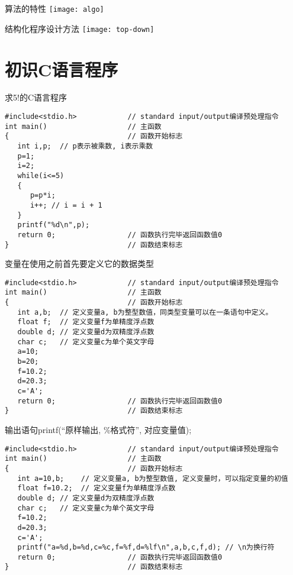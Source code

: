 \begin{frame}{算法的特性}
\texttt{[image: algo]}
\end{frame}

\begin{frame}{结构化程序设计方法}
\texttt{[image: top-down]}
\end{frame}

\section{初识C语言程序}

\begin{frame}[fragile]{求5!的C语言程序}
\begin{lstlisting}
#include<stdio.h>            // standard input/output编译预处理指令
int main()                   // 主函数
{                            // 函数开始标志
   int i,p;  // p表示被乘数, i表示乘数
   p=1;
   i=2;
   while(i<=5)
   {  
      p=p*i;
      i++; // i = i + 1
   }
   printf("%d\n",p);
   return 0;                 // 函数执行完毕返回函数值0
}                            // 函数结束标志
\end{lstlisting}
\end{frame}

\begin{frame}[fragile]{变量在使用之前首先要定义它的数据类型}
\begin{lstlisting}
#include<stdio.h>            // standard input/output编译预处理指令
int main()                   // 主函数
{                            // 函数开始标志
   int a,b;  // 定义变量a, b为整型数值，同类型变量可以在一条语句中定义。
   float f;  // 定义变量f为单精度浮点数
   double d; // 定义变量d为双精度浮点数
   char c;   // 定义变量c为单个英文字母
   a=10;
   b=20;
   f=10.2;
   d=20.3;
   c='A';
   return 0;                 // 函数执行完毕返回函数值0
}                            // 函数结束标志
\end{lstlisting}
\end{frame}

\begin{frame}[fragile]{输出语句printf(``原样输出, \%格式符'', 对应变量值);}
\begin{lstlisting}
#include<stdio.h>            // standard input/output编译预处理指令
int main()                   // 主函数
{                            // 函数开始标志
   int a=10,b;    // 定义变量a, b为整型数值, 定义变量时，可以指定变量的初值
   float f=10.2;  // 定义变量f为单精度浮点数
   double d; // 定义变量d为双精度浮点数
   char c;   // 定义变量c为单个英文字母
   f=10.2;
   d=20.3;
   c='A';
   printf("a=%d,b=%d,c=%c,f=%f,d=%lf\n",a,b,c,f,d); // \n为换行符
   return 0;                 // 函数执行完毕返回函数值0
}                            // 函数结束标志
\end{lstlisting}
\end{frame}

